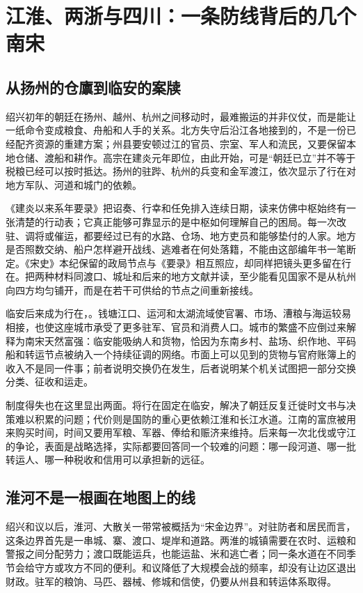 \section{江淮、两浙与四川：一条防线背后的几个南宋}

\subsection{从扬州的仓廪到临安的案牍}

绍兴初年的朝廷在扬州、越州、杭州之间移动时，最难搬运的并非仪仗，而是能让一纸命令变成粮食、舟船和人手的关系。北方失守后沿江各地接到的，不是一份已经配齐资源的重建方案；州县要安顿过江的官员、宗室、军人和流民，又要保留本地仓储、渡船和耕作。高宗在建炎元年即位，由此开始，可是“朝廷已立”并不等于税粮已经可以按时抵达。扬州的驻跸、杭州的兵变和金军渡江，依次显示了行在对地方军队、河道和城门的依赖。

《建炎以来系年要录》把诏奏、行幸和任免排入连续日期，读来仿佛中枢始终有一张清楚的行动表；它真正能够可靠显示的是中枢如何理解自己的困局。每一次改驻、调将或催运，都要经过已有的水路、仓场、地方吏员和能够垫付的人家。地方是否照数交纳、船户怎样避开战线、逃难者在何处落籍，不能由这部编年书一笔断定。《宋史》本纪保留的政局节点与《要录》相互照应，却同样把镜头更多留在行在。把两种材料同渡口、城址和后来的地方文献并读，至少能看见国家不是从杭州向四方均匀铺开，而是在若干可供给的节点之间重新接线。

临安后来成为行在，。钱塘江口、运河和太湖流域使官署、市场、漕粮与海运较易相接，也使这座城市承受了更多驻军、官员和消费人口。城市的繁盛不应倒过来解释为南宋天然富强：临安能吸纳人和货物，恰因为东南乡村、盐场、织作地、平码船和转运节点被纳入一个持续征调的网络。市面上可以见到的货物与官府账簿上的收入不是同一件事；前者说明交换仍在发生，后者说明某个机关试图把一部分交换分类、征收和运走。

制度得失也在这里显出两面。将行在固定在临安，解决了朝廷反复迁徙时文书与决策难以积累的问题；代价则是国防的重心更依赖江淮和长江水道。江南的富庶被用来购买时间，时间又要用军粮、军器、俸给和赈济来维持。后来每一次北伐或守江的争论，表面是战略选择，实际都要回答同一个较难的问题：哪一段河道、哪一批转运人、哪一种税收和信用可以承担新的远征。

\subsection{淮河不是一根画在地图上的线}

绍兴和议以后，淮河、大散关一带常被概括为“宋金边界”。对驻防者和居民而言，这条边界首先是一串城、寨、渡口、堤岸和道路。两淮的城镇需要在农时、运粮和警报之间分配劳力；渡口既能运兵，也能运盐、米和逃亡者；同一条水道在不同季节会给守方或攻方不同的便利。和议降低了大规模会战的频率，却没有让边区退出财政。驻军的粮饷、马匹、器械、修城和信使，仍要从州县和转运体系取得。

